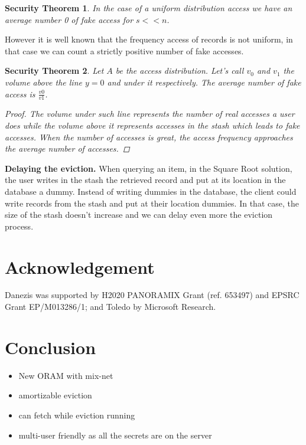 \documentclass{llncs}
\newtheorem{secthm}{Security Theorem}
\begin{document}
\begin{secthm}
In the case of a uniform distribution access we have an average number 0 of fake access for $s<<n$.\\
\end{secthm}

However it is well known that the frequency access of records is not uniform, in that case we can count a strictly positive number of fake accesses.
\begin{secthm}
Let $A$ be the access distribution. Let's call $v_0$ and $v_1$ the volume above the line $y=0$ and under it respectively.
The average number of fake access is $ \frac{v0}{v1}$.
\begin{proof}
 The volume under such line represents the number of real accesses a user does while the volume above it represents accesses in the stash which leads to fake accesses.
 When the number of accesses is great, the access frequency approaches the average number of accesses.
\end{proof}
\end{secthm}

\noindent\textbf{Delaying the eviction.} When querying an item, in the Square Root solution, the user writes in the stash the retrieved record and put at its location in the database a dummy. Instead of writing dummies in the database, the client could write records from the stash and put at their location dummies. In that case, the size of the stash doesn't increase and we can delay even more the eviction process.


\section{Acknowledgement}
Danezis was supported by H2020  PANORAMIX Grant (ref. 653497) and EPSRC Grant EP/M013286/1; and Toledo by Microsoft Research.


\section{Conclusion}
\label{Conclusion}
\begin{itemize}
 \item New ORAM with mix-net
 \item amortizable eviction
 \item can fetch while eviction running
 \item multi-user friendly as all the secrets are on the server
\end{itemize}
\end{document}
